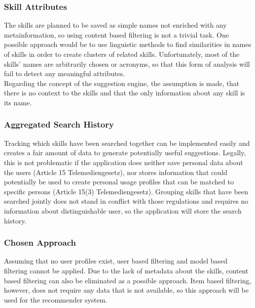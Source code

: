\newpage

\subsubsection{Skill Attributes}
The skills are planned to be saved as simple names not enriched with any metainformation, so using content based filtering is not a trivial task. One possible approach would be to use linguistic methods to find similarities in names of skills in order to create clusters of related skills. Unfortunately, most of the skills' names are arbitrarily chosen or acronyms, so that this form of analysis will fail to detect any meaningful attributes.\\
Regarding the concept of the suggestion engine, the assumption is made, that there is no context to the skills and that the only information about any skill is its name.

\subsubsection{Aggregated Search History}
Tracking which skills have been searched together can be implemented easily and creates a fair amount of data to generate potentially useful suggestions. Legally, this is not problematic if the application does neither save personal data about the users (Article 15 Telemediengesetz), nor stores information that could potentially be used to create personal usage profiles that can be matched to specific persons (Article 15(3) Telemediengesetz). Grouping skills that have been searched jointly does not stand in conflict with those regulations and requires no information about distinguishable user, so the application will store the search history.

\subsubsection{Chosen Approach}
Assuming that no user profiles exist, user based filtering and model based filtering cannot be applied. Due to the lack of metadata about the skills, content based filtering can also be eliminated as a possible approach. Item based filtering, however, does not require any data that is not available, so this approach will be used for the recommender system.

\newpage

